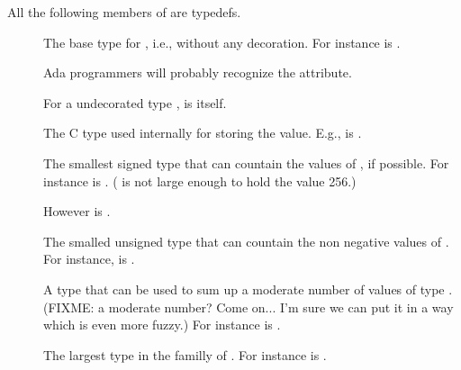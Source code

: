 All the following members of  are typedefs.
\begin{description}
\item[] The base type for , i.e.,  without
any decoration.  For instance
is .

Ada programmers will probably recognize the  attribute.

For a undecorated type ,  is
 itself.

\item[] The C type used internally for storing the
value.  E.g.,  is
.


\item[]
The smallest signed type that can countain the values of , if possible.
For instance
 is .
( is not large enough to hold the value 256.)

However  is .

\item[]
The smalled unsigned type that can countain the non negative values of
.
For instance,
 is .

\item[]
A type that can be used to sum up a moderate number of values of type
.  (FIXME: a moderate number?  Come on...  I'm sure we can put
it in a way which is even more fuzzy.)
For instance
 is .

\item[]
The largest type in the familly of .  For instance
 is .


\end{description}
